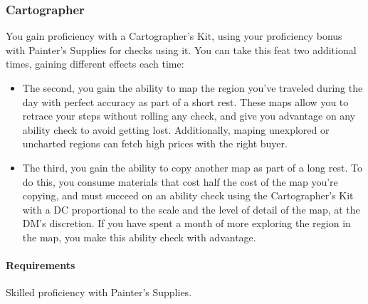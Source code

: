 \subsubsection{Cartographer} \label{feat::cartographer}
    You gain proficiency with a Cartographer's Kit, using your proficiency bonus with Painter's Supplies for checks using it.
    You can take this feat two additional times, gaining different effects each time:
    \begin{itemize}
        \item The second, you gain the ability to map the region you've traveled during the day with perfect accuracy as part of a short rest.
        These maps allow you to retrace your steps without rolling any check, and give you advantage on any ability check to avoid getting lost.
        Additionally, maping unexplored or uncharted regions can fetch high prices with the right buyer.
        \item The third, you gain the ability to copy another map as part of a long rest.
        To do this, you consume materials that cost half the cost of the map you're copying, and must succeed on an ability check using the Cartographer's Kit with a DC proportional to the scale and the level of detail of the map, at the DM's discretion.
        If you have spent a month of more exploring the region in the map, you make this ability check with advantage.
    \end{itemize}
    \paragraph{Requirements} Skilled proficiency with Painter's Supplies.

